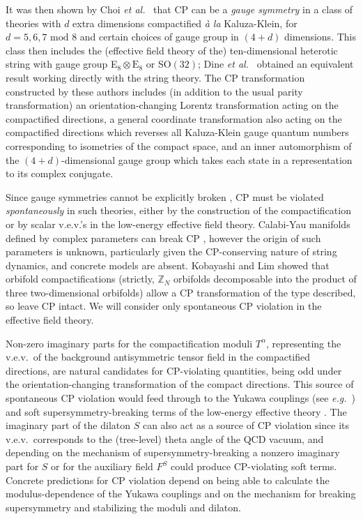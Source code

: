 \documentclass[a4paper,12pt]{article}
\begin{document}
It was then shown by Choi {\em et al.\/}\ \cite{ChoiKN} that CP can be a {\em gauge symmetry}\/ in a class of theories with $d$ extra dimensions compactified {\em \`a la}\/ Kaluza-Klein, for $d=5,6,7\mbox{ mod }8$ and certain choices of gauge group in $(4+d)$ dimensions. This class then includes the (effective field theory of the) ten-dimensional heterotic string with gauge group E$_8\otimes\mbox{E}_8$ or SO$(32)$; Dine {\em et al.\/}\ \cite{DineLM} obtained an equivalent result working directly with the string theory. The CP transformation constructed by these authors includes (in addition to the usual parity transformation) an orientation-changing Lorentz transformation acting on the compactified directions, a general coordinate transformation also acting on the compactified directions which reverses all Kaluza-Klein gauge quantum numbers corresponding to isometries of the compact space, and an inner automorphism of the $(4+d)$-dimensional gauge group which takes each state in a representation to its complex conjugate.

Since gauge symmetries cannot be explicitly broken \cite{Krauss:1989zc}, CP must be violated {\em spontaneously}\/ in such theories, either by the construction of the compactification or by scalar v.e.v.'s in the low-energy effective field theory. Calabi-Yau manifolds defined by complex parameters can break CP \cite{StroWitten85}, however the origin of such parameters is unknown, particularly given the CP-conserving nature of string dynamics, and concrete models are absent. Kobayashi and Lim \cite{KobayashiL} showed that orbifold compactifications (strictly, $\mathbb{Z}_N$ orbifolds decomposable into the product of three two-dimensional orbifolds) allow a CP transformation of the type described, so leave CP intact. We will consider only spontaneous CP violation in the effective field theory.

Non-zero imaginary parts for the compactification moduli $T^\alpha$, representing the v.e.v.\ of the background antisymmetric tensor field in the compactified directions, are natural candidates for CP-violating quantities, being odd under the orientation-changing transformation of the compact directions. This source of spontaneous CP violation would feed through to the Yukawa couplings (see {\em e.g.\/}\ \cite{BailinLS93}) and soft supersymmetry-breaking terms of the low-energy effective theory \cite{IbanezLust,Bailin:1998iz+97}. The imaginary part of the dilaton $S$ can also act as a source of CP violation since its v.e.v.\ corresponds to the (tree-level) theta angle of the QCD vacuum, and depending on the mechanism of supersymmetry-breaking a nonzero imaginary part for $S$ or for the auxiliary field $F^S$ could produce CP-violating soft terms. Concrete predictions for CP violation depend on being able to calculate the modulus-dependence of the Yukawa couplings and on the mechanism for breaking supersymmetry and stabilizing the moduli and dilaton.
\end{document}
